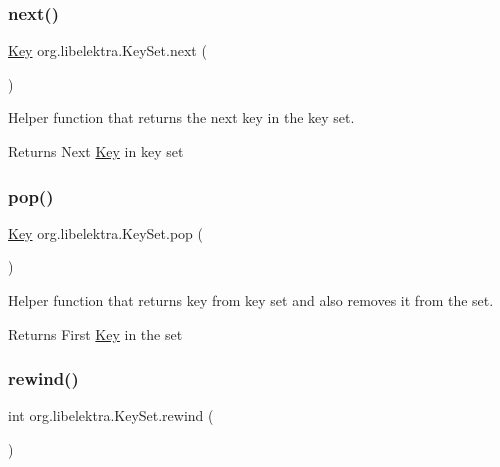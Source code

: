\subsubsection{\texorpdfstring{next()}{next()}}
{\footnotesize\ttfamily \hyperlink{classorg_1_1libelektra_1_1Key}{Key} org.\+libelektra.\+Key\+Set.\+next (\begin{DoxyParamCaption}{ }\end{DoxyParamCaption})\hspace{0.3cm}{\ttfamily [inline]}}



Helper function that returns the next key in the key set. 

\begin{DoxyReturn}{Returns}
Next \hyperlink{classorg_1_1libelektra_1_1Key}{Key} in key set 
\end{DoxyReturn}
\mbox{\label{classorg_1_1libelektra_1_1KeySet_a6fcb652d72c64772bae40ec801d93ad9}} 
\subsubsection{\texorpdfstring{pop()}{pop()}}
{\footnotesize\ttfamily \hyperlink{classorg_1_1libelektra_1_1Key}{Key} org.\+libelektra.\+Key\+Set.\+pop (\begin{DoxyParamCaption}{ }\end{DoxyParamCaption})\hspace{0.3cm}{\ttfamily [inline]}}



Helper function that returns key from key set and also removes it from the set. 

\begin{DoxyReturn}{Returns}
First \hyperlink{classorg_1_1libelektra_1_1Key}{Key} in the set 
\end{DoxyReturn}
\mbox{\label{classorg_1_1libelektra_1_1KeySet_a20533a5e97b16b76b977b95be179d58c}} 
\subsubsection{\texorpdfstring{rewind()}{rewind()}}
{\footnotesize\ttfamily int org.\+libelektra.\+Key\+Set.\+rewind (\begin{DoxyParamCaption}{ }\end{DoxyParamCaption})\hspace{0.3cm}{\ttfamily [inline]}}



